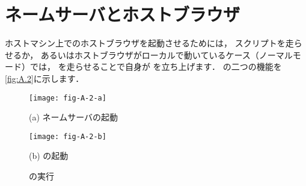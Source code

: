 \section{ネームサーバとホストブラウザ}
\label{sec:A.1}
%
%
%
%
ホストマシン上でのホストブラウザを起動させるためには，
%
%
スクリプトを走らせるか，
あるいはホストブラウザがローカルで動いているケース（ノーマルモード）では，
を走らせることで自身が
を立ち上げます．
の二つの機能を\autoref{fig:A.2}に示します．


\begin{figure}[ht]
 \begin{minipage}{.49\textwidth}
  \centering
  \texttt{[image: fig-A-2-a]}\par
  (a) ネームサーバの起動
 \end{minipage}
 \begin{minipage}{.49\textwidth}
  \centering
  \texttt{[image: fig-A-2-b]}\par
  (b) の起動
 \end{minipage}
 \caption{の実行}
 \label{fig:A.2}
\end{figure}


